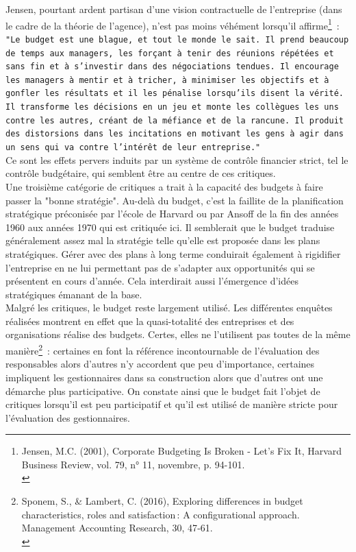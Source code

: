 \documentclass{tufte-handout}
\begin{document}
Jensen, pourtant ardent partisan d'une vision contractuelle de l'entreprise (dans le cadre de la théorie de l'agence), n'est pas moins véhément lorsqu'il affirme\footnote{Jensen, M.C. (2001), Corporate Budgeting Is Broken - Let's Fix It, Harvard Business Review, vol. 79, n° 11, novembre, p. 94-101.\\} :\\
\texttt{"Le budget est une blague, et tout le monde le sait. Il prend beaucoup de temps aux managers, les forçant à tenir des réunions répétées et sans fin et à s'investir dans des négociations tendues. Il encourage les managers à mentir et à tricher, à minimiser les objectifs et à gonfler les résultats et il les pénalise lorsqu'ils disent la vérité. Il transforme les décisions en un jeu et monte les collègues les uns contre les autres, créant de la méfiance et de la rancune. Il produit des distorsions dans les incitations en motivant les gens à agir dans un sens qui va contre l'intérêt de leur entreprise."}\\
Ce sont les effets pervers induits par un système de contrôle financier strict, tel le contrôle budgétaire, qui semblent être au centre de ces critiques.\\
Une troisième catégorie de critiques a trait à la capacité des budgets à faire passer la "bonne stratégie". Au-delà du budget, c'est la faillite de la planification stratégique préconisée par l'école de Harvard ou par Ansoff de la fin des années 1960 aux années 1970 qui est critiquée ici. Il semblerait que le budget traduise généralement assez mal la stratégie telle qu'elle est proposée dans les plans stratégiques. Gérer avec des plans à long terme conduirait également à rigidifier l'entreprise en ne lui permettant pas de s'adapter aux opportunités qui se présentent en cours d'année. Cela interdirait aussi l'émergence d'idées stratégiques émanant de la base.\\

Malgré les critiques, le budget reste largement utilisé. Les différentes enquêtes réalisées montrent en effet que la quasi-totalité des entreprises et des organisations réalise des budgets. Certes, elles ne l'utilisent pas toutes de la même manière\footnote{Sponem, S., \& Lambert, C. (2016), Exploring differences in budget characteristics, roles and satisfaction : A configurational approach. Management Accounting Research, 30, 47‑61.\\} : certaines en font la référence incontournable de l'évaluation des responsables alors d'autres n'y accordent que peu d'importance, certaines impliquent les gestionnaires dans sa construction alors que d'autres ont une démarche plus participative. On constate ainsi que le budget fait l'objet de critiques lorsqu'il est peu participatif et qu'il est utilisé de manière stricte pour l'évaluation des gestionnaires.\\
\end{document}

